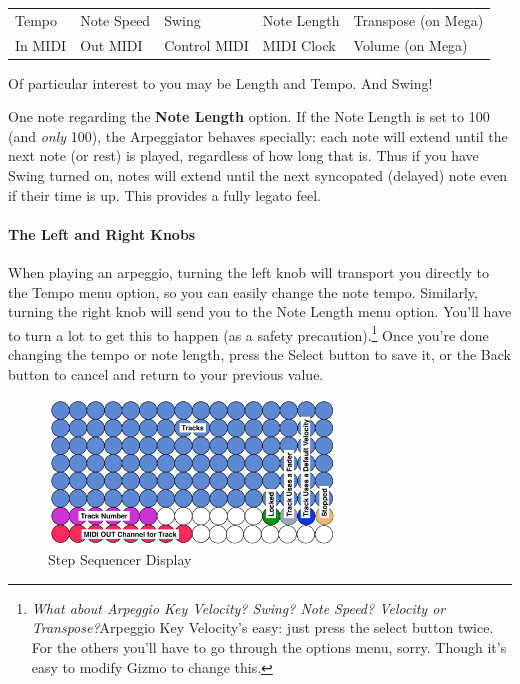 \documentclass{article}
\begin{document}
\vspace{0.75em}
\begin{tabular}{lllll}
Tempo& Note Speed& Swing & Note Length&Transpose (on Mega)\\
In MIDI& Out MIDI&Control MIDI&MIDI Clock&Volume (on Mega)\\
\end{tabular}

\vspace{0.75em}
Of particular interest to you may be Length and Tempo.  And Swing!

One note regarding the {\bf Note Length} option.  If the Note Length is set to 100 (and {\it only} 100), the Arpeggiator behaves specially: each note will extend until the next note (or rest) is played, regardless of how long that is.  Thus if you have Swing turned on, notes will extend until the next syncopated (delayed) note even if their time is up. This provides a fully legato feel.


\paragraph{The Left and Right Knobs}  When playing an arpeggio, turning the left knob will transport you directly to the Tempo menu option, so you can easily change the note tempo.  Similarly, turning the right knob will send you to the Note Length menu option.  You'll have to turn a lot to get this to happen (as a safety precaution).\footnote{{\it What about Arpeggio Key Velocity?  Swing?  Note Speed? Velocity or Transpose?}\qquad Arpeggio Key Velocity's easy: just press the select button twice.  For the others you'll have to go through the options menu, sorry.  Though it's easy to modify Gizmo to change this.}  Once you're done changing the tempo or note length, press the Select button to save it, or the Back button to cancel and return to your previous value.

\clearpage


\begin{figure}
\vspace{-1.5em}\includegraphics[width=3in]{stepsequencer}
\vspace{-2em}\caption{\small Step Sequencer Display}\vspace{-1em}
\label{stepsequencer}
\end{figure}
\end{document}
